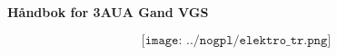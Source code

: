 \documentclass[10pt,a5paper,norsk]{article}
\begin{document}
\huge
\begin{center}
\textbf{Håndbok for 3AUA Gand VGS} \bigskip
\end{center}

\vskip 1cm
		$$\texttt{[image: ../nogpl/elektro\_tr.png]}$$
\normalsize
\vfil \eject












\vfil \eject
\end{document}

